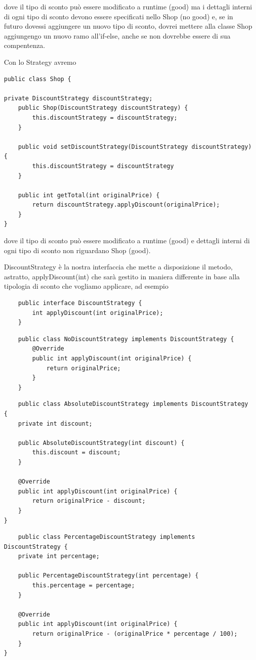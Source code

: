 dove il tipo di sconto può essere modificato a runtime (good) ma i dettagli interni di ogni tipo di sconto devono essere specificati nello Shop (no good) e, se 
in futuro dovessi aggiungere un nuovo tipo di sconto, dovrei mettere alla classe Shop aggiungengo un nuovo ramo all'if-else, anche se non dovrebbe essere di sua 
compentenza.

Con lo Strategy avremo 
\begin{lstlisting}
public class Shop {

private DiscountStrategy discountStrategy;
    public Shop(DiscountStrategy discountStrategy) {
        this.discountStrategy = discountStrategy;
    }

    public void setDiscountStrategy(DiscountStrategy discountStrategy) {
        this.discountStrategy = discountStrategy
    }

    public int getTotal(int originalPrice) {
        return discountStrategy.applyDiscount(originalPrice);
    }
}
\end{lstlisting}

dove il tipo di sconto può essere modificato a runtime (good) e dettagli interni di ogni tipo di sconto non riguardano Shop (good).

DiscountStrategy è la nostra interfaccia che mette a disposizione il metodo, astratto, applyDiscount(int) che sarà gestito in maniera differente in base alla tipologia
di sconto che vogliamo applicare, ad esempio
\newpage
\begin{multicols}{2}
\begin{lstlisting}
    public interface DiscountStrategy {
        int applyDiscount(int originalPrice);
    }
\end{lstlisting}
\columnbreak
\begin{lstlisting}
    public class NoDiscountStrategy implements DiscountStrategy {
        @Override
        public int applyDiscount(int originalPrice) {
            return originalPrice;
        }
    }
\end{lstlisting}
\end{multicols}

\begin{multicols}{2}
\begin{lstlisting}
    public class AbsoluteDiscountStrategy implements DiscountStrategy {
    private int discount;
    
    public AbsoluteDiscountStrategy(int discount) {
        this.discount = discount;
    }

    @Override
    public int applyDiscount(int originalPrice) {
        return originalPrice - discount;
    }
}    
\end{lstlisting}
\columnbreak
\begin{lstlisting}
    public class PercentageDiscountStrategy implements DiscountStrategy {
    private int percentage;
    
    public PercentageDiscountStrategy(int percentage) {
        this.percentage = percentage;
    }

    @Override
    public int applyDiscount(int originalPrice) {
        return originalPrice - (originalPrice * percentage / 100);
    }
}
\end{lstlisting}
\end{multicols}

